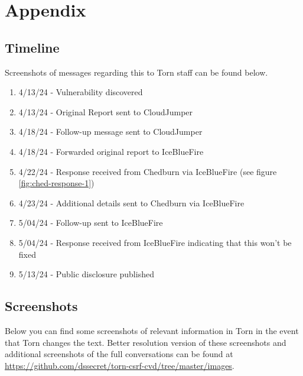 \documentclass{article}
\begin{document}
{\newpage
\section{Appendix}
\subsection{Timeline} \label{sec:timeline}
\par{Screenshots of messages regarding this to Torn staff can be found below.}

\begin{enumerate}
	\item 4/13/24 - Vulnerability discovered
	\item 4/13/24 - Original Report sent to CloudJumper
	\item 4/18/24 - Follow-up message sent to CloudJumper
	\item 4/18/24 - Forwarded original report to IceBlueFire
	\item 4/22/24 - Response received from Chedburn via IceBlueFire (see figure \ref{fig:ched-response-1})
	\item 4/23/24 - Additional details sent to Chedburn via IceBlueFire
	\item 5/04/24 - Follow-up sent to IceBlueFire
	\item 5/04/24 - Response received from IceBlueFire indicating that this won't be fixed
	\item 5/13/24 - Public disclosure published
\end{enumerate}

\subsection{Screenshots}
\par{Below you can find some screenshots of relevant information in Torn in the event that Torn changes the text. Better resolution version of these screenshots and additional screenshots of the full conversations can be found at \url{https://github.com/dssecret/torn-csrf-cvd/tree/master/images}.}

}
\end{document}
